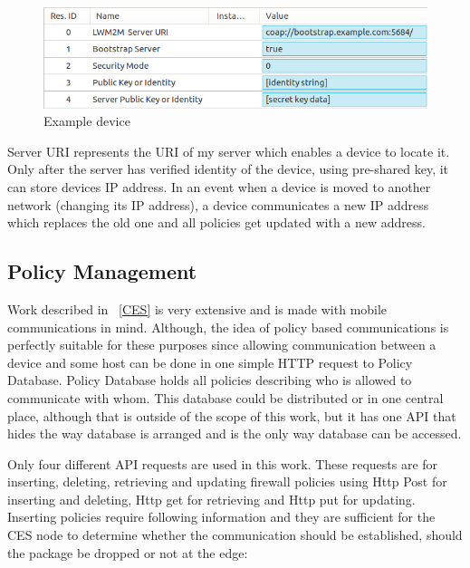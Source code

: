 \begin{figure}[ht]
	\begin{center}
		\includegraphics[width=\textwidth]{images/Device}
		\caption{Example device}
		\label{fig:device}
	\end{center}
\end{figure}

Server URI represents the URI of my server which enables a device to locate it. Only after the server has verified identity of the device, using pre-shared key, it can store devices IP address. In an event when a device is moved to another network (changing its IP address), a device communicates a new IP address which replaces the old one and all policies get updated with a new address.

\subsection{Policy Management}
\label{policyManagement}

Work described in ~\ref{CES} is very extensive and is made with mobile communications in mind. Although, the idea of policy based communications is perfectly suitable for these purposes since allowing communication between a device and some host can be done in one simple HTTP request to Policy Database. Policy Database holds all policies describing who is allowed to communicate with whom. This database could be distributed or in one central place, although that is outside of the scope of this work, but it has one API that hides the way database is arranged and is the only way database can be accessed. 

Only four different API requests are used in this work. These requests are for inserting, deleting, retrieving and updating firewall policies using Http Post for inserting and deleting, Http get for retrieving and Http put for updating. Inserting policies require following information and they are sufficient for the CES node to determine whether the communication should be established, should the package be dropped or not at the edge: 

